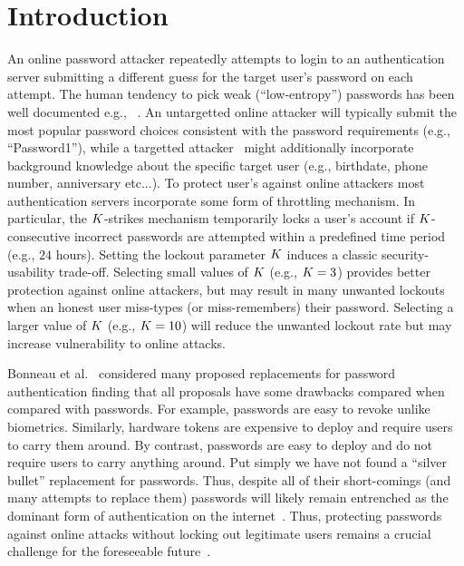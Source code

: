 \section{Introduction}\label{sec: Introduction}
An online password attacker repeatedly attempts to login to an authentication server submitting a different guess for the target user's password on each attempt. The human tendency to pick weak (``low-entropy'') passwords has been well documented e.g., ~\cite{SP:Bonneau12}. An untargetted online attacker will typically submit the most popular password choices consistent with the password requirements (e.g., ``Password1''), while a targetted attacker~\cite{CCS:WZWYH16} might additionally incorporate background knowledge about the specific target user (e.g., birthdate, phone number, anniversary etc...). To protect user's against online attackers most authentication servers incorporate some form of throttling mechanism. In particular, the $K$-strikes mechanism temporarily locks a user's account if $K$-consecutive incorrect passwords are attempted within a predefined time period (e.g., $24$ hours). Setting the lockout parameter $K$ induces a classic security-usability trade-off. Selecting small values of $K$ (e.g., $K=3$) provides better protection against online attackers, but may result in many unwanted lockouts when an honest user miss-types (or miss-remembers) their password. Selecting a larger value of $K$ (e.g., $K=10$) will reduce the unwanted lockout rate but may increase vulnerability to online attacks. 

Bonneau et al.~\cite{SP:BHVS12} considered many proposed replacements for password authentication finding that all proposals have some drawbacks compared when compared with passwords. For example, passwords are easy to revoke unlike biometrics. Similarly, hardware tokens are expensive to deploy and require users to carry them around. By contrast, passwords are easy to deploy and do not require users to carry anything around. Put simply we have not found a ``silver bullet'' replacement for passwords. Thus, despite all of their short-comings (and many attempts to replace them) passwords will likely remain entrenched as the dominant form of authentication on the internet~\cite{PasswordPersistence}. Thus, protecting passwords against online attacks without locking out legitimate users remains a crucial challenge for the foreseeable future~\cite{DuoWeakPassword,DictionaryAttack:Ransomware,DictionaryAttack:Microsoft}. 

